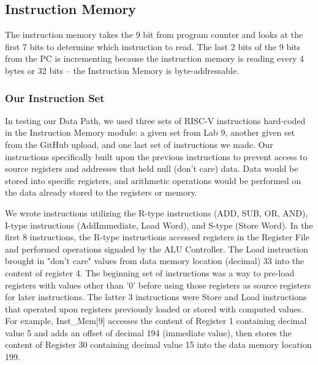 \documentclass{article}
\begin{document}
\subsection{Instruction Memory}
The instruction memory takes the 9 bit from program counter and looks at the first 7 bits to determine which instruction to read. The last 2 bits of the 9 bits from the PC is incrementing because the instruction memory is reading every 4 bytes or 32 bits -- the Instruction Memory is byte-addressable.
\subsubsection{Our Instruction Set}
In testing our Data Path, we used three sets of RISC-V instructions hard-coded in the Instruction Memory module: a given set from Lab 9, another given set from the GitHub upload, and one last set of instructions we made. Our instructions specifically built upon the previous instructions to prevent access to source registers and addresses that held null (don't care) data. Data would be stored into specific registers, and arithmetic operations would be performed on the data already stored to the registers or memory.

We wrote instructions utilizing the R-type instructions (ADD, SUB, OR, AND), I-type instructions (AddImmediate, Load Word), and S-type (Store Word). In the first 8 instructions, the R-type instructions accessed registers in the Register File and performed operations signaled by the ALU Controller. The Load instruction brought in "don't care" values from data memory location (decimal) 33 into the content of register 4. The beginning set of instructions was a way to pre-load registers with values other than '0' before using those registers as source registers for later instructions. The latter 3 instructions were Store and Load instructions that operated upon registers previously loaded or stored with computed values. For example, Inst\_Mem[9] accesses the content of Register 1 containing decimal value 5 and adds an offset of decimal 194 (immediate value), then stores the content of Register 30 containing decimal value 15 into the data memory location 199.
\end{document}
